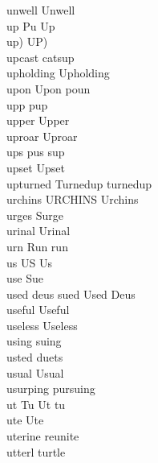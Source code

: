unwell Unwell\\
up Pu Up\\
up) UP)\\
upcast catsup\\
upholding Upholding\\
upon Upon poun\\
upp pup\\
upper Upper\\
uproar Uproar\\
ups pus sup\\
upset Upset\\
upturned Turnedup turnedup\\
urchins URCHINS Urchins\\
urges Surge\\
urinal Urinal\\
urn Run run\\
us US Us\\
use Sue\\
used deus sued Used Deus\\
useful Useful\\
useless Useless\\
using suing\\
usted duets\\
usual Usual\\
usurping pursuing\\
ut Tu Ut tu\\
ute Ute\\
uterine reunite\\
utterl turtle\\

